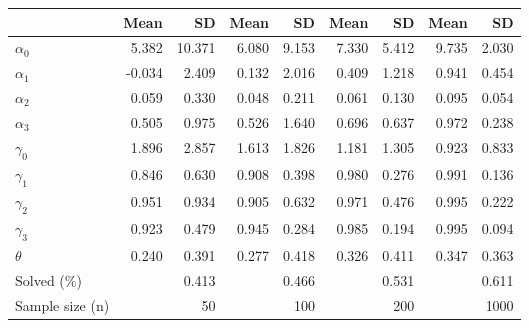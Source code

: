 
\begin{tabular}[t]{lrrrrrrrr}
\toprule
  & Mean & SD & Mean  & SD  & Mean   & SD   & Mean    & SD   \\
\midrule
$\alpha_{0}$ & 5.382 & 10.371 & 6.080 & 9.153 & 7.330 & 5.412 & 9.735 & 2.030\\
$\alpha_{1}$ & -0.034 & 2.409 & 0.132 & 2.016 & 0.409 & 1.218 & 0.941 & 0.454\\
$\alpha_{2}$ & 0.059 & 0.330 & 0.048 & 0.211 & 0.061 & 0.130 & 0.095 & 0.054\\
$\alpha_{3}$ & 0.505 & 0.975 & 0.526 & 1.640 & 0.696 & 0.637 & 0.972 & 0.238\\
$\gamma_{0}$ & 1.896 & 2.857 & 1.613 & 1.826 & 1.181 & 1.305 & 0.923 & 0.833\\
$\gamma_{1}$ & 0.846 & 0.630 & 0.908 & 0.398 & 0.980 & 0.276 & 0.991 & 0.136\\
$\gamma_{2}$ & 0.951 & 0.934 & 0.905 & 0.632 & 0.971 & 0.476 & 0.995 & 0.222\\
$\gamma_{3}$ & 0.923 & 0.479 & 0.945 & 0.284 & 0.985 & 0.194 & 0.995 & 0.094\\
$\theta$ & 0.240 & 0.391 & 0.277 & 0.418 & 0.326 & 0.411 & 0.347 & 0.363\\
Solved (\%) &  & 0.413 &  & 0.466 &  & 0.531 &  & 0.611\\
Sample size (n) &  & 50 &  & 100 &  & 200 &  & 1000\\
\bottomrule
\end{tabular}

